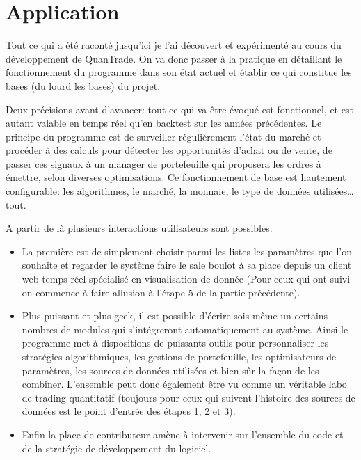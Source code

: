 \section{Application}


    Tout ce qui a été raconté jusqu'ici je l'ai découvert et expérimenté au
cours du développement de QuanTrade. On va donc passer à la pratique en
détaillant le fonctionnement du programme dans son état actuel et établir
ce qui constitue les bases (du lourd les bases) du projet.

    Deux précisions avant d'avancer: tout ce qui va être évoqué est
fonctionnel, et est autant valable en temps réel qu'en backtest sur les
années précédentes. \newline
Le principe du programme est de surveiller régulièrement l'état du
marché et procéder à des calculs pour détecter les opportunités d'achat
ou de vente, de passer ces signaux à un manager de portefeuille qui
proposera les ordres à émettre, selon diverses optimisations. Ce
fonctionnement de base est hautement configurable: les algorithmes, le
marché, la monnaie, le type de données utilisées\ldots tout.\newline

A partir de là plusieurs interactions utilisateurs sont possibles. \newline

\begin{itemize}

  \item La première est de simplement choisir parmi les listes les
    paramètres que l'on souhaite et regarder le système faire le sale
    boulot à sa place depuis un client web temps réel spécialisé en
    visualisation de donnée (Pour ceux qui ont suivi on commence à faire
    allusion à l'étape 5 de la partie précédente).\newline

  \item Plus puissant et plus geek, il est possible d'écrire sois même un
    certains nombres de modules qui s'intégreront automatiquement au
    système. Ainsi le programme met à dispositions de puissants outils pour
    personnaliser les stratégies algorithmiques, les gestions de
    portefeuille, les optimisateurs de paramètres, les sources de données
    utilisées et bien sûr la façon de les combiner. L'ensemble peut donc
    également être vu comme un véritable labo de trading quantitatif
    (toujours pour ceux qui suivent l'histoire des sources de données
    est le point d'entrée des étapes 1, 2 et 3).\newline

  \item Enfin la place de contributeur amène à intervenir sur l'ensemble du
    code et de la stratégie de développement du logiciel.\newline

\end{itemize}

